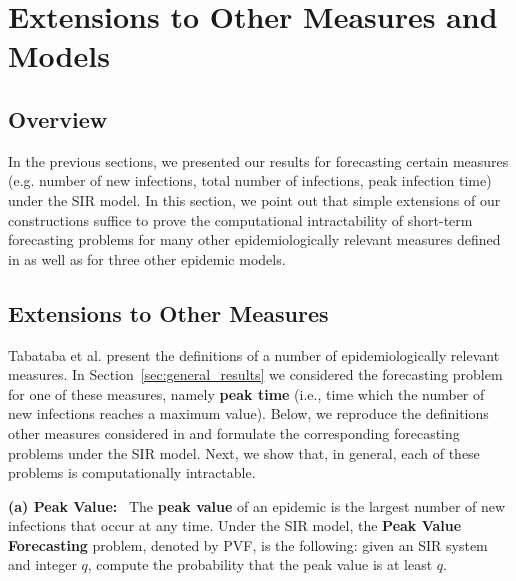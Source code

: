\section{Extensions to Other Measures and Models}
\label{sec:extensions}

\subsection{Overview}
\label{sse:extensions_overview}

In the previous sections, we presented our results for 
forecasting certain
measures (e.g. number of new infections, total number of infections,
peak infection time) under the SIR model.
In this section, we point out that simple extensions of our constructions 
suffice to prove the computational intractability of short-term forecasting 
problems for many other epidemiologically
relevant measures defined in \cite{TC+2016} as well as for three
other epidemic models. 

\subsection{Extensions to Other Measures}
\label{sse:ext_measures}

Tabataba et al. \cite{TC+2016} present the definitions
of a number of epidemiologically relevant measures.
In Section~\ref{sec:general_results} we considered 
the forecasting problem for 
one of these measures, namely \textbf{peak time} (i.e., time which
the number of new infections reaches a maximum value).
Below, we reproduce the definitions other measures 
considered in \cite{TC+2016} and 
formulate the corresponding forecasting problems under the SIR model.
Next, we show that, in general, each of these problems is
computationally intractable.

\medskip
\noindent
\textbf{(a) Peak Value:}~ The \textbf{peak value} of an epidemic
is the largest number of new infections that occur at any time. 
Under the SIR model, the \textbf{Peak Value Forecasting} problem, denoted by
PVF, is the following: given an SIR system and integer $q$, compute
the probability that the peak value is at least $q$.

